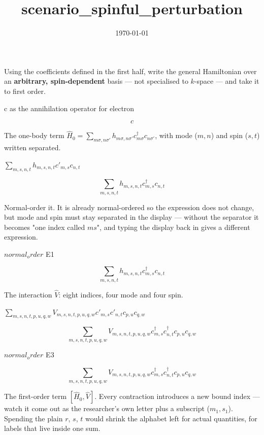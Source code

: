 \documentclass[dvipdfmx]{article}
\title{scenario\_spinful\_perturbation}
\date{\today}
\begin{document}
\maketitle

Using the coefficients defined in the first half, write the general Hamiltonian over an \textbf{arbitrary, spin-dependent} basis — not specialised to $k$-space — and take it to first order.

c as the annihilation operator for electron

\[
  c
\]

The one-body term $\hat H_0=\sum_{m\sigma,n\sigma'} h_{m\sigma,n\sigma'} c^\dagger_{m\sigma}c_{n\sigma'}$, with mode ($m,n$) and spin ($s,t$) written separated.

$\sum_{m,s,n,t} h_{m,s,n,t} c'_{m,s} c_{n,t}$

\begin{equation}
  \sum_{m,s,n,t} h_{m,s,n,t} c^{\dagger}_{m,s} c_{n,t}
  \label{eq:E1}
\end{equation}

Normal-order it. It is already normal-ordered so the expression does not change, but mode and spin must stay separated in the display — without the separator it becomes "one index called $ms$", and typing the display back in gives a different expression.

$normal_order$ E1

\begin{equation}
  \sum_{m,s,n,t} h_{m,s,n,t} {c}_{m,s}^{\dagger} {c}_{n,t}
  \label{eq:E2}
\end{equation}

The interaction $\hat V$: eight indices, four mode and four spin.

$\sum_{m,s,n,t,p,u,q,w} V_{m,s,n,t,p,u,q,w} c'_{m,s} c'_{n,t} c_{p,u} c_{q,w}$

\begin{equation}
  \sum_{m,s,n,t,p,u,q,w} V_{m,s,n,t,p,u,q,w} c^{\dagger}_{m,s} c^{\dagger}_{n,t} c_{p,u} c_{q,w}
  \label{eq:E3}
\end{equation}

$normal_order$ E3

\begin{equation}
  \sum_{m,s,n,t,p,u,q,w} V_{m,s,n,t,p,u,q,w} {c}_{m,s}^{\dagger} {c}_{n,t}^{\dagger} {c}_{p,u} {c}_{q,w}
  \label{eq:E4}
\end{equation}

The first-order term $[\hat H_0,\hat V]$. Every contraction introduces a new bound index — watch it come out as the researcher's own letter plus a subscript ($m_1,s_1$). Spending the plain $r$, $s$, $t$ would shrink the alphabet left for actual quantities, for labels that live inside one sum.
\end{document}
